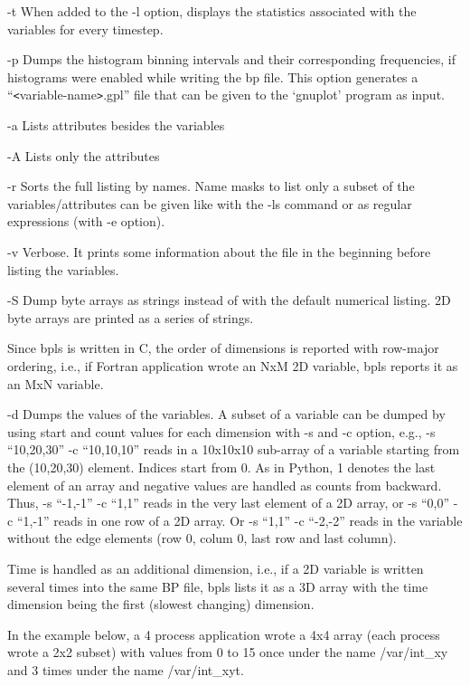 -t  When added to the -l option, displays the statistics associated with the variables 
for every timestep. 

-p Dumps the histogram binning intervals and their corresponding frequencies, if 
histograms were enabled while writing the bp file. This option generates a ``\texttt{<}variable-name\texttt{>}.gpl'' 
file that can be given to the `gnuplot' program as input. 

-a Lists attributes besides the variables

-A Lists only the attributes

-r Sorts the full listing by names. Name masks to list only a subset of the variables/attributes 
can be given like with the -ls command or as regular expressions (with -e option).

-v Verbose. It prints some information about the file in the beginning before listing 
the variables. 

-S Dump byte arrays as strings instead of with the default numerical listing. 2D 
byte arrays are printed as a series of strings. 

\leftskip=0pt
\parindent=0pt
Since bpls is written in C, the order of dimensions is reported with row-major 
ordering, i.e., if Fortran application wrote an NxM 2D variable, bpls reports it 
as an MxN variable. 

\leftskip=36pt
\parindent=-36pt
-d Dumps the values of the variables. A subset of a variable can be dumped by using 
start and count values for each dimension with -s and -c option, e.g., -s ``10,20,30'' 
-c ``10,10,10'' reads in a 10x10x10 sub-array of a variable starting from the (10,20,30) 
element. Indices start from 0. As in Python, \-{}1 denotes the last element of 
an array and negative values are handled as counts from backward. Thus, -s ``-1,-1'' 
-c ``1,1'' reads in the very last element of a 2D array, or -s ``0,0'' -c ``1,-1'' 
reads in one row of a 2D array. Or -s ``1,1'' -c ``-2,-2'' reads in the variable 
without the edge elements (row 0, colum 0, last row and last column).

\leftskip=0pt
\parindent=0pt
Time is handled as an additional dimension, i.e., if a 2D variable is written several 
times into the same BP file, bpls lists it as a 3D array with the time dimension 
being the first (slowest changing) dimension. 

In the example below, a 4 process application wrote a 4x4 array (each process wrote 
a 2x2 subset) with values from 0 to 15 once under the name /var/int\_xy and 3 times 
under the name /var/int\_xyt. 

